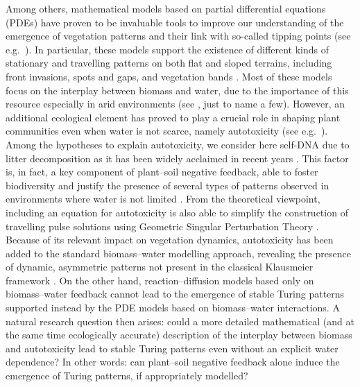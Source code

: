 \documentclass[11pt]{elsarticle}
\theoremstyle{plain}
\theoremstyle{definition}
\theoremstyle{myremark}
\begin{document}
Among others, mathematical models based on partial differential equations (PDEs) have proven to be invaluable tools to improve our understanding of the emergence of vegetation patterns and their link with so-called tipping points (see e.g.~\cite{Bastiaansen_2020_2, Martinez_Garcia_2023, Rietkerk_2021}). In particular, these models support the existence of different kinds of stationary and travelling patterns on both flat and sloped terrains, including front invasions, spots and gaps, and vegetation bands \cite{Jaibi_2020}. Most of these models focus on the interplay between biomass and water, due to the importance of this resource especially in arid environments (see \cite{Bastiaansen_2020_1, Bastiaansen_2019_1, Carter_2018, Eigentler_2020, Gandhi_2021, Gandhi_2018, Gilad_2007, Klausmeier_1999, Meron_2012, Sherratt.2010, von_Hardenberg_2001}, just to name a few). However, an additional ecological element has proved to play a crucial role in shaping plant communities even when water is not scarce, namely autotoxicity (see e.g.~\cite{Abbas_2025, Bonanomi_2014, Carteni_2012, Consolo_2023, Marasco_2020, Marasco_2014, Mazzoleni_2010, Mazzoleni_2014}). Among the hypotheses to explain autotoxicity, we consider here self-DNA due to litter decomposition as it has been widely acclaimed in recent years \cite{Mazzoleni_2015, Mazzoleni_2014}. This factor is, in fact, a key component of plant--soil negative feedback, able to foster biodiversity and justify the presence of several types of patterns observed in environments where water is not limited \cite{Allegrezza_2022, Salvatori_2023}. 
From the theoretical viewpoint, including an equation for autotoxicity is also able to simplify the construction of travelling pulse solutions using Geometric Singular Perturbation Theory \cite{grifo2025far}. Because of its relevant impact on vegetation dynamics, autotoxicity has been added to the standard biomass--water modelling approach, revealing the presence of dynamic, asymmetric patterns not present in the classical Klausmeier framework \cite{Abbas_2024, Carter_2023_2, Iuorio_2021, Marasco_2014}. On the other hand, reaction--diffusion models based only on biomass--water feedback cannot lead to the emergence of stable Turing patterns supported instead by the PDE models based on biomass--water interactions. A natural research question then arises: could a more detailed mathematical (and at the same time ecologically accurate) description of the interplay between biomass and autotoxicity lead to stable Turing patterns even without an explicit water dependence? In other words: can plant--soil negative feedback alone induce the emergence of Turing patterns, if appropriately modelled?
\end{document}
